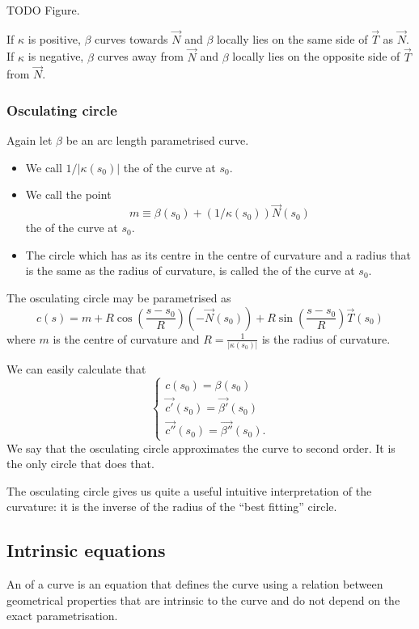TODO Figure. 

If $\kappa$ is positive, $\beta$ curves towards $\vec{N}$ and $\beta$ locally lies on the same side of $\vec{T}$ as $\vec{N}$. If $\kappa$ is negative, $\beta$ curves away from $\vec{N}$ and $\beta$ locally lies on the opposite side of $\vec{T}$ from $\vec{N}$.

\subsubsection{Osculating circle}
Again let $\beta$ be an arc length parametrised curve.
\begin{definition}
\begin{itemize}
\item We call $1/|\kappa(s_0)|$ the  of the curve at $s_0$.
\item We call the point
\[ m \equiv \beta(s_0) + (1/\kappa(s_0))\vec{N}(s_0) \]
the  of the curve at $s_0$.
\item The circle which has as its centre in the centre of curvature and a radius that is the same as the radius of curvature, is called the  of the curve at $s_0$.
\end{itemize}
\end{definition}
The osculating circle may be parametrised as
\[ c(s) = m + R\cos \left(\frac{s-s_0}{R}\right)(- \vec{N}(s_0)) + R\sin \left(\frac{s-s_0}{R}\right)\vec{T}(s_0) \]
where $m$ is the centre of curvature and $R = \frac{1}{|\kappa(s_0)|}$ is the radius of curvature.

We can easily calculate that
\[ \begin{cases}
c(s_0) = \beta(s_0) \\
\vec{c'}(s_0) = \vec{\beta'}(s_0) \\
\vec{c''}(s_0) = \vec{\beta''}(s_0).
\end{cases} \]
We say that the osculating circle approximates the curve to second order. It is the only circle that does that.

The osculating circle gives us quite a useful intuitive interpretation of the curvature:
it is the inverse of the radius of the ``best fitting'' circle.

\subsection{Intrinsic equations}
An  of a curve is an equation that defines the curve using a relation between geometrical properties that are intrinsic to the curve and do not depend on the exact parametrisation.

